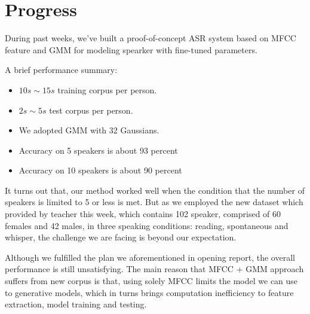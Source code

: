 
\section{Progress}
	During past weeks, we've built a proof-of-concept ASR system based on
	MFCC feature and GMM for modeling spearker with fine-tuned parameters.

	A brief performance summary:
	\begin{itemize}
		\item $10s\sim15s$ training corpus per person.
		\item $2s\sim5s$ test corpus per person.
		\item We adopted GMM with $32$ Gaussians.
		\item Accuracy on 5 speakers is about 93 percent
		\item Accuracy on 10 speakers is about 90 percent
	\end{itemize}

	It turns out that, our method worked well when the condition that the number of
	speakers is limited to 5 or less is met. But as we employed the new dataset
	which provided by teacher this week, which contains 102 speaker, comprised
	of 60 females and 42 males, in three speaking conditions: reading,
	spontaneous and whisper, the challenge we are facing is beyond our expectation.

	Although we fulfilled the plan we aforementioned in opening report, the overall
	performance is still unsatisfying.
	The main reason that MFCC + GMM approach suffers from new corpus is that,
	using solely MFCC limits the model we can use to generative models,
	which in turns brings computation inefficiency to feature extraction, model
	training and testing.


